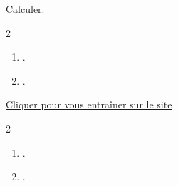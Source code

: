 \begin{exercice*}
    Calculer.
    \begin{multicols}2
        \begin{enumerate}
            \item .
            \item .
        \end{enumerate}
    \end{multicols}

    \href{.}{Cliquer pour vous entraîner sur le site \mathaleaLogo} 
\end{exercice*}
\begin{corrige}
    \phantom{rrr}    
    \begin{multicols}2
        \begin{enumerate}
            \item .
            \item .
        \end{enumerate}
    \end{multicols}
\end{corrige}

